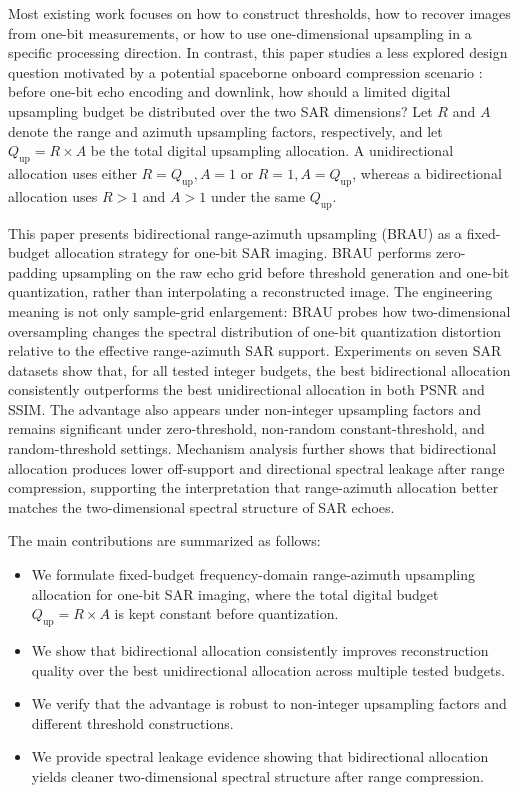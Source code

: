 \documentclass[conference]{IEEEtran}
\begin{document}
Most existing work focuses on how to construct thresholds, how to recover images from one-bit measurements, or how to use one-dimensional upsampling in a specific processing direction. In contrast, this paper studies a less explored design question motivated by a potential spaceborne onboard compression scenario \cite{magli2003lossy}: before one-bit echo encoding and downlink, how should a limited digital upsampling budget be distributed over the two SAR dimensions? Let $R$ and $A$ denote the range and azimuth upsampling factors, respectively, and let $Q_{\mathrm{up}}=R\times A$ be the total digital upsampling allocation. A unidirectional allocation uses either $R=Q_{\mathrm{up}},A=1$ or $R=1,A=Q_{\mathrm{up}}$, whereas a bidirectional allocation uses $R>1$ and $A>1$ under the same $Q_{\mathrm{up}}$.

This paper presents bidirectional range-azimuth upsampling (BRAU) as a fixed-budget allocation strategy for one-bit SAR imaging. BRAU performs zero-padding upsampling on the raw echo grid before threshold generation and one-bit quantization, rather than interpolating a reconstructed image. The engineering meaning is not only sample-grid enlargement: BRAU probes how two-dimensional oversampling changes the spectral distribution of one-bit quantization distortion relative to the effective range-azimuth SAR support. Experiments on seven SAR datasets show that, for all tested integer budgets, the best bidirectional allocation consistently outperforms the best unidirectional allocation in both PSNR and SSIM. The advantage also appears under non-integer upsampling factors and remains significant under zero-threshold, non-random constant-threshold, and random-threshold settings. Mechanism analysis further shows that bidirectional allocation produces lower off-support and directional spectral leakage after range compression, supporting the interpretation that range-azimuth allocation better matches the two-dimensional spectral structure of SAR echoes.

The main contributions are summarized as follows:
\begin{itemize}
    \item We formulate fixed-budget frequency-domain range-azimuth upsampling allocation for one-bit SAR imaging, where the total digital budget $Q_{\mathrm{up}}=R\times A$ is kept constant before quantization.
    \item We show that bidirectional allocation consistently improves reconstruction quality over the best unidirectional allocation across multiple tested budgets.
    \item We verify that the advantage is robust to non-integer upsampling factors and different threshold constructions.
    \item We provide spectral leakage evidence showing that bidirectional allocation yields cleaner two-dimensional spectral structure after range compression.
\end{itemize}
\end{document}
